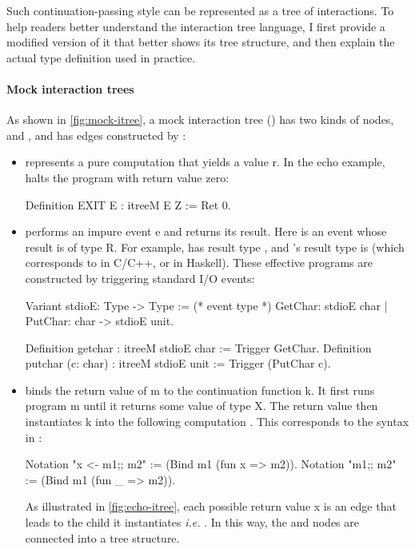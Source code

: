 Such continuation-passing style can be represented as a tree of interactions.
To help readers better understand the interaction tree language, I first provide
a modified version of it that better shows its tree structure, and then explain
the actual type definition used in practice.

\paragraph{Mock interaction trees}
As shown in \autoref{fig:mock-itree}, a mock interaction tree () has
two kinds of nodes,  and , and has edges constructed by
:
\begin{itemize}
\item {} represents a pure computation that yields a value \ilc r.
  In the echo example,  halts the program with return value zero:
\begin{coq}
  Definition EXIT {E} : itreeM E Z := Ret 0.
\end{coq}
\item {} performs an impure event \ilc e and returns its result.
  Here  is an event whose result is of type \ilc R.  For example,
   has result type , and 's result type is
   (which corresponds to  in C/C++, or \ilc{()} in
  Haskell).  These effective programs are constructed by triggering standard I/O
  events:
\begin{coq}
  Variant stdioE: Type -> Type := (* event type *)
    GetChar:         stdioE char
  | PutChar: char -> stdioE unit.
  
  Definition getchar : itreeM stdioE char := Trigger GetChar.
  Definition putchar (c: char) : itreeM stdioE unit
                               := Trigger (PutChar c).
\end{coq}
\item {} binds the return value of \ilc m to the continuation
  function \ilc k.  It first runs program \ilc m until it returns some value of
  type \ilc X.  The return value  then instantiates \ilc k into the
  following computation .  This corresponds to the
  \ilc{(;;)} syntax in :
\begin{coq}
  Notation "x <- m1;; m2" := (Bind m1 (fun x => m2)).
  Notation "m1;; m2"      := (Bind m1 (fun _ => m2)).
\end{coq}

As illustrated in \autoref{fig:echo-itree}, each possible return value \ilc x is
an edge that leads to the child it instantiates {\it i.e.} .  In this
way, the  and  nodes are connected into a tree
structure.
\end{itemize}

